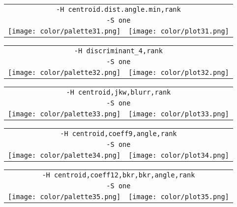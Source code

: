 \documentclass{article}
\begin{document}
\begin{center}
\begin{tabular}{m{8cm}m{8cm}}
\multicolumn{2}{c}{\tt -H centroid.dist.angle.min,rank} \\
\multicolumn{2}{c}{\tt -S one} \\
\texttt{[image: color/palette31.png]} &
\texttt{[image: color/plot31.png]}
\end{tabular}
\end{center}

\begin{center}
\begin{tabular}{m{8cm}m{8cm}}
\multicolumn{2}{c}{\tt -H discriminant\_4,rank} \\
\multicolumn{2}{c}{\tt -S one} \\
\texttt{[image: color/palette32.png]} &
\texttt{[image: color/plot32.png]}
\end{tabular}
\end{center}

\begin{center}
\begin{tabular}{m{8cm}m{8cm}}
\multicolumn{2}{c}{\tt -H centroid,jkw,blurr,rank} \\
\multicolumn{2}{c}{\tt -S one} \\
\texttt{[image: color/palette33.png]} &
\texttt{[image: color/plot33.png]}
\end{tabular}
\end{center}

\begin{center}
\begin{tabular}{m{8cm}m{8cm}}
\multicolumn{2}{c}{\tt -H centroid,coeff9,angle,rank} \\
\multicolumn{2}{c}{\tt -S one} \\
\texttt{[image: color/palette34.png]} &
\texttt{[image: color/plot34.png]}
\end{tabular}
\end{center}

\begin{center}
\begin{tabular}{m{8cm}m{8cm}}
\multicolumn{2}{c}{\tt -H centroid,coeff12,bkr,bkr,angle,rank} \\
\multicolumn{2}{c}{\tt -S one} \\
\texttt{[image: color/palette35.png]} &
\texttt{[image: color/plot35.png]}
\end{tabular}
\end{center}
\end{document}
